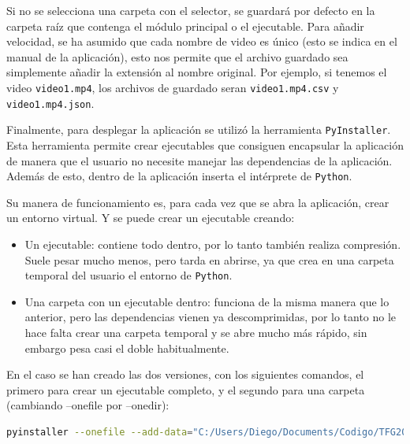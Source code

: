 Si no se selecciona una carpeta con el selector, se guardará por defecto en la carpeta raíz que contenga el módulo principal o el ejecutable.\newline
Para añadir velocidad, se ha asumido que cada nombre de video es único (esto se indica en el manual de la aplicación), esto nos permite que el archivo guardado sea simplemente añadir la extensión al nombre original. 
Por ejemplo, si tenemos el video \verb|video1.mp4|, los archivos de guardado seran \verb|video1.mp4.csv| y \verb|video1.mp4.json|.

\vspace{1\baselineskip}

Finalmente, para desplegar la aplicación se utilizó la herramienta \texttt{PyInstaller}. Esta herramienta permite crear ejecutables que consiguen encapsular la aplicación de manera que el usuario no necesite 
manejar las dependencias de la aplicación. Además de esto, dentro de la aplicación inserta el intérprete de \texttt{Python}.

Su manera de funcionamiento es, para cada vez que se abra la aplicación, crear un entorno virtual. Y se puede crear un ejecutable creando:
\begin{itemize}
    \item Un ejecutable: contiene todo dentro, por lo tanto también realiza compresión. Suele pesar mucho menos, pero tarda en abrirse, ya que crea en una carpeta temporal del usuario el entorno de \texttt{Python}.
    \item Una carpeta con un ejecutable dentro: funciona de la misma manera que lo anterior, pero las dependencias vienen ya descomprimidas, por lo tanto no le hace falta crear una carpeta temporal y se abre mucho 
    más rápido, sin embargo pesa casi el doble habitualmente.
\end{itemize}

En el caso se han creado las dos versiones, con los siguientes comandos, el primero para crear un ejecutable completo, y el segundo para una carpeta (cambiando --onefile por --onedir):
\begin{lstlisting}[language=bash,breaklines=true]
    pyinstaller --onefile --add-data="C:/Users/Diego/Documents/Codigo/TFG2024/.venv/Lib/site-packages/ultralytics":"ultralytics/" --add-binary="C:/Users/Diego/Documents/Codigo/TFG2024/.venv/Lib/site-packages/openvino/libs":"." --hidden-import openvino --collect-submodules openvino --collect-binaries openvino --collect-data openvino --hidden-import onnx --hidden-import onnxruntime  .\main.py
\end{lstlisting}

